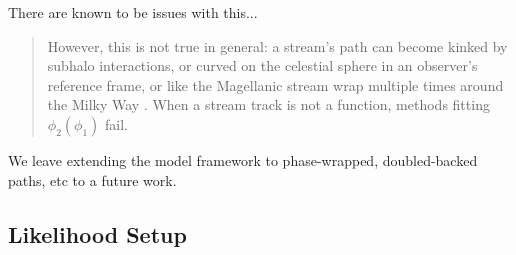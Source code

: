 \documentclass[twocolumn]{aastex631}
\begin{document}
        There are known to be issues with this...

        \begin{quotation}
            However, this is not true in general: a
            stream's path can become kinked by subhalo interactions, or curved on the
            celestial sphere in an observer's reference frame, or like the Magellanic
            stream wrap multiple times around the Milky Way \citep{Wannier1972}. When a
            stream track is not a function, methods fitting $\phi_2(\phi_1)$ fail.
        \end{quotation}

        We leave extending the model framework to phase-wrapped, doubled-backed paths, etc to a future work.
    

    \subsection{Likelihood Setup}\label{sub:likelihood_setup}

\end{document}
